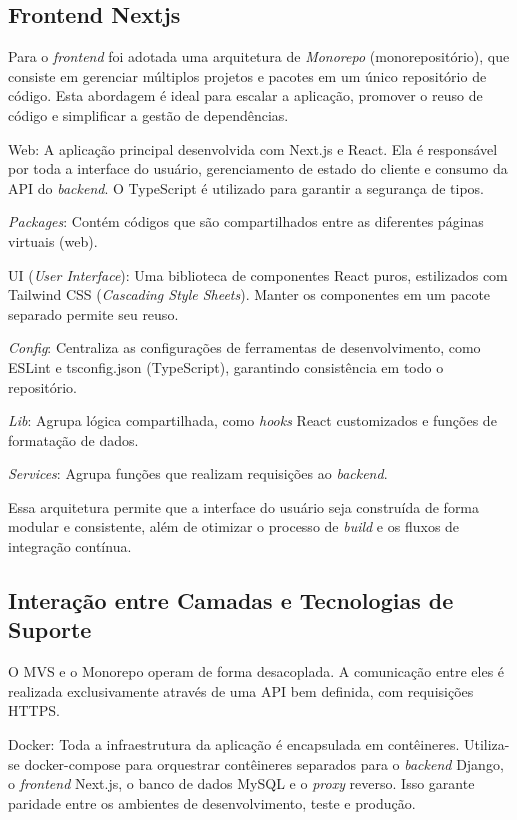 \subsection[Frontend Nextjs]{Frontend Nextjs}
\label{arquitetura-frontend}
Para o \textit{frontend} foi adotada uma arquitetura de \textit{Monorepo} (monorepositório), que consiste em gerenciar múltiplos projetos e pacotes em um único repositório de código. Esta abordagem é ideal para escalar a aplicação, promover o reuso de código e simplificar a gestão de dependências.

Web: A aplicação principal desenvolvida com Next.js e React. Ela é responsável por toda a interface do usuário, gerenciamento de estado do cliente e consumo da API do \textit{backend}. O TypeScript é utilizado para garantir a segurança de tipos.

\textit{Packages}: Contém códigos que são compartilhados entre as diferentes páginas virtuais (web).

UI (\textit{User Interface}): Uma biblioteca de componentes React puros, estilizados com Tailwind CSS (\textit{Cascading Style Sheets}). Manter os componentes em um pacote separado permite seu reuso.

\textit{Config}: Centraliza as configurações de ferramentas de desenvolvimento, como ESLint e tsconfig.json (TypeScript), garantindo consistência em todo o repositório.

\textit{Lib}: Agrupa lógica compartilhada, como \textit{hooks} React customizados e funções de formatação de dados.

\textit{Services}: Agrupa funções que realizam requisições ao \textit{backend}.

Essa arquitetura permite que a interface do usuário seja construída de forma modular e consistente, além de otimizar o processo de \textit{build} e os fluxos de integração contínua.

\subsection [Interação entre Camadas e Tecnologias de Suporte]{Interação entre Camadas e Tecnologias de Suporte}

O MVS e o Monorepo operam de forma desacoplada. A comunicação entre eles é realizada exclusivamente através de uma API bem definida, com requisições HTTPS.

Docker: Toda a infraestrutura da aplicação é encapsulada em contêineres. Utiliza-se docker-compose para orquestrar contêineres separados para o \textit{backend} Django, o \textit{frontend} Next.js, o banco de dados MySQL e o \textit{proxy} reverso. Isso garante paridade entre os ambientes de desenvolvimento, teste e produção.

